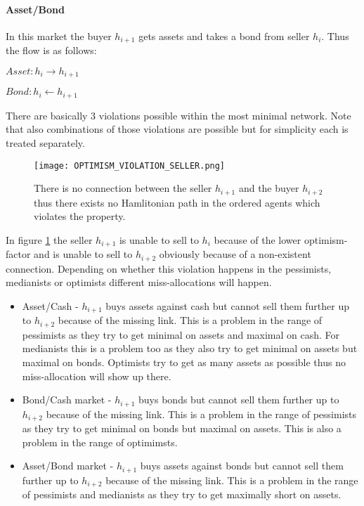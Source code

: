\documentclass[Bachelorarbeit.tex]{subfiles}
\begin{document}
\paragraph{Asset/Bond} In this market the buyer $h_{i+1}$ gets assets and takes a bond from seller $h_i$. Thus the flow is as follows:
\begin{center}
$Asset: h_i \to h_{i+1}$
\end{center}
\begin{center}
$Bond: h_i \gets h_{i+1}$
\end{center}

\medskip

There are basically 3 violations possible within the most minimal network. Note that also combinations of those violations are possible but for simplicity each is treated separately.

\begin{figure}[H]
	\centering
  \texttt{[image: OPTIMISM\_VIOLATION\_SELLER.png]}
  	\caption{There is no connection between the seller $h_{i+1}$ and the buyer $h_{i+2}$ thus there exists no Hamlitonian path in the ordered agents which violates the property.}
	\label{fig:OPTIMISM_VIOLATION_SELLER}
\end{figure}

In figure \ref{fig:OPTIMISM_VIOLATION_SELLER} the seller $h_{i+1}$ is unable to sell to $h_i$ because of the lower optimism-factor and is unable to sell to $h_{i+2}$ obviously because of a non-existent connection. Depending on whether this violation happens in the pessimists, medianists or optimists different miss-allocations will happen.

\begin{itemize}
\item Asset/Cash - $h_{i+1}$ buys assets against cash but cannot sell them further up to $h_{i+2}$ because of the missing link. This is a problem in the range of pessimists as they try to get minimal on assets and maximal on cash. For medianists this is a problem too as they also try to get minimal on assets but maximal on bonds. Optimists try to get as many assets as possible thus no miss-allocation will show up there.
\item Bond/Cash market - $h_{i+1}$ buys bonds but cannot sell them further up to $h_{i+2}$ because of the missing link. This is a problem in the range of pessimists as they try to get minimal on bonds but maximal on assets. This is also a problem in the range of optimimsts.
\item Asset/Bond market - $h_{i+1}$ buys assets against bonds but cannot sell them further up to $h_{i+2}$ because of the missing link. This is a problem in the range of pessimists and medianists as they try to get maximally short on assets.
\end{itemize}
\end{document}
